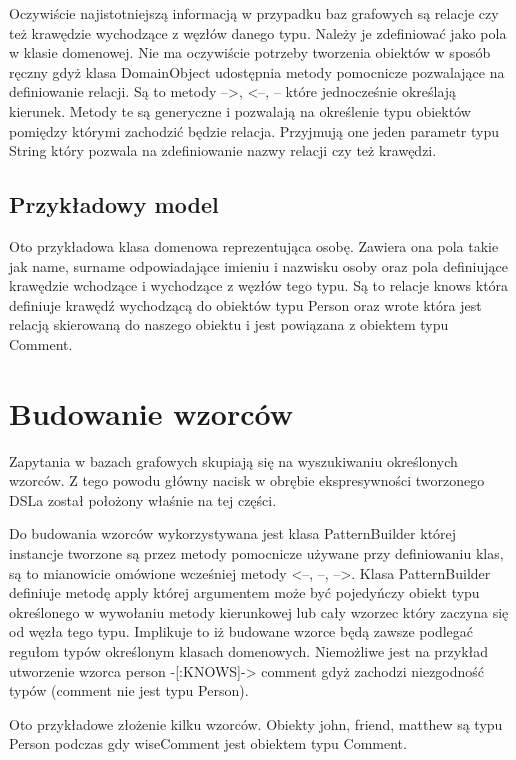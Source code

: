 \documentclass[brudnopis]{xmgr}
\begin{document}
Oczywiście najistotniejszą informacją w przypadku baz grafowych są relacje czy też krawędzie wychodzące z węzłów danego typu. Należy je zdefiniować jako pola w klasie domenowej. Nie ma oczywiście potrzeby tworzenia obiektów w sposób ręczny gdyż klasa DomainObject udostępnia metody pomocnicze pozwalające na definiowanie relacji. Są to metody  -->, <--, -- które jednocześnie określają kierunek. Metody te są generyczne i pozwalają na określenie typu obiektów pomiędzy którymi zachodzić będzie relacja. Przyjmują one jeden parametr typu String który pozwala na zdefiniowanie nazwy relacji czy też krawędzi.

\subsection{Przykładowy model}

Oto przykładowa klasa domenowa reprezentująca osobę. Zawiera ona pola takie jak name, surname odpowiadające imieniu i nazwisku osoby oraz pola definiujące krawędzie wchodzące i wychodzące z węzłów tego typu. Są to relacje knows która definiuje krawędź wychodzącą do obiektów typu Person oraz wrote która jest relacją skierowaną do naszego obiektu i jest powiązana z obiektem typu Comment.



\section{Budowanie wzorców}

Zapytania w bazach grafowych skupiają się na wyszukiwaniu określonych wzorców. Z tego powodu główny nacisk w obrębie ekspresywności tworzonego DSLa został położony właśnie na tej części.

Do budowania wzorców wykorzystywana jest klasa PatternBuilder której instancje tworzone są przez metody pomocnicze używane przy definiowaniu klas, są to mianowicie omówione wcześniej metody <--, --, -->. Klasa PatternBuilder definiuje metodę apply której argumentem może być pojedyńczy obiekt typu określonego w wywołaniu metody kierunkowej lub cały wzorzec który zaczyna się od węzła tego typu. Implikuje to iż budowane wzorce będą zawsze podlegać regułom typów określonym klasach domenowych. Niemożliwe jest na przykład utworzenie wzorca person -[:KNOWS]-> comment gdyż zachodzi niezgodność typów (comment nie jest typu Person).

Oto przykładowe złożenie kilku wzorców. Obiekty john, friend, matthew są typu Person podczas gdy wiseComment jest obiektem typu Comment.
\end{document}
